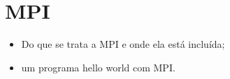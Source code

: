 \section{MPI}

	\begin{itemize}
		\item Do que se trata a MPI e onde ela está incluída;
		\item um programa hello world com MPI.
	\end{itemize}